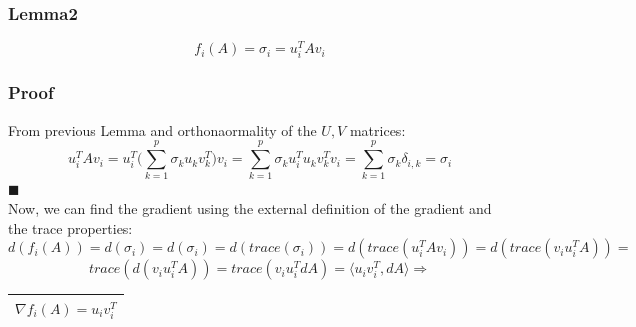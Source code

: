 \documentclass[12pt]{article}
\newcommand{\rectres}[1]{
\begin{center}
\begin{tabular}{ |c| }
\hline
 #1\\
\hline
\end{tabular}
\end{center}
}
\newcommand{\qed}{\hfill$\blacksquare$}
\begin{document}
\subsubsection*{Lemma2}
$$f_i(A)=\sigma_i=u_i^T A v_i$$
\subsubsection*{Proof}
From previous Lemma and orthonaormality of the $U,V$ matrices:
$$u_i^T A v_i=u_i^T \Big(\sum_{k=1}^p \sigma_k u_{k} v^T_{k}\Big)v_i=\sum_{k=1}^p \sigma_k u_i^T  u_{k} v^T_{k}v_i = \sum_{k=1}^p \sigma_k \delta_{i,k}=\sigma_i$$
\qed\\
Now, we can find the gradient using the external definition of the gradient and the trace properties:
$$d(f_i(A))=d(\sigma_i)=d(\sigma_i)=d(trace(\sigma_i))=d(trace(u_i^T A v_i))=d(trace(v_i u_i^T A )) = $$
$$trace(d(v_i u_i^T A ))=trace(v_i u_i^T dA ) = \langle u_i v_i^T, dA \rangle \Rightarrow$$
\rectres{$\nabla f_i(A)=u_i v_i^T$}
\end{document}
